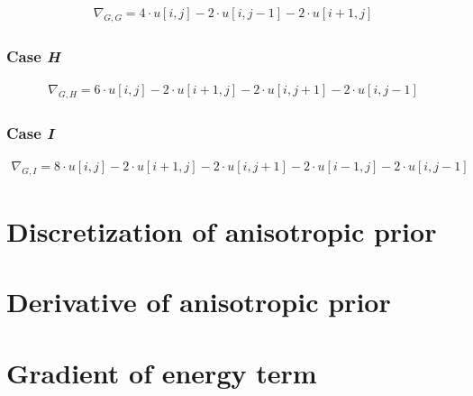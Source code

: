 \documentclass[a4paper]{scrreprt}
\begin{document}
\begin{align*}
		\nabla_{G, G} = 
		  4 \cdot u[i, j] - 2 \cdot u[i, j - 1] - 2 \cdot u[i + 1, j]
\end{align*}

\subsubsection{Case \emph{H}}

\begin{align*}
		\nabla_{G, H} =
		  6 \cdot u[i, j] - 2 \cdot u[i + 1, j] - 2 \cdot u[i, j + 1] - 2 \cdot u[i, j - 1]
\end{align*}

\subsubsection{Case \emph{I}}

\begin{align*}
		\nabla_{G, I} =
		  8 \cdot u[i, j] - 2 \cdot u[i + 1, j] - 2 \cdot u[i, j + 1] - 2 \cdot u[i - 1, j] - 2 \cdot u[i, j - 1]
\end{align*}


\section{Discretization of anisotropic prior}

\section{Derivative of anisotropic prior}

\section{Gradient of energy term}

\printbibliography
\end{document}
